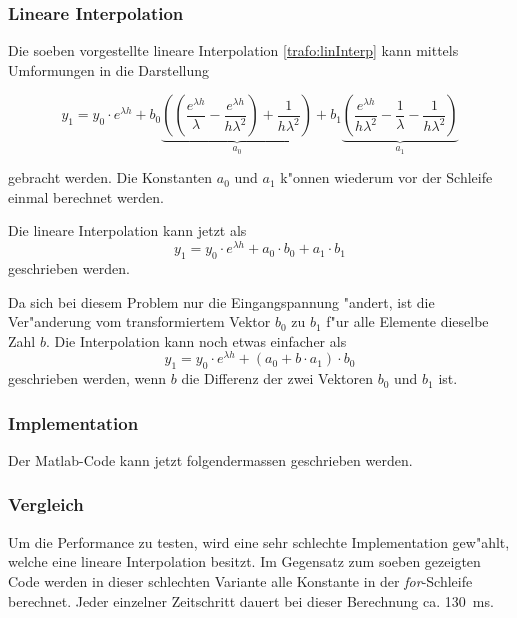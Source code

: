 \begin{refsection}
\subsubsection{Lineare Interpolation}
Die soeben vorgestellte lineare Interpolation \ref{trafo:linInterp} kann mittels Umformungen in die Darstellung 

\begin{equation*}
	y_1 = y_0 \cdot e^{\lambda h} + b_0 \underbrace{\left(\left(\frac{e^{\lambda h}}{\lambda} - \frac{e^{\lambda h}}{h\lambda ^2}\right) + \frac{1}{h \lambda^2}\right)}_{a_0} + b_1 \underbrace{\left(\frac{e^{\lambda h}}{h \lambda^2} - \frac{1}{\lambda} - \frac{1}{h \lambda^2}\right)}_{a_1}
\end{equation*} 

gebracht werden. Die Konstanten $a_0$ und $a_1$ k"onnen wiederum vor der Schleife einmal berechnet werden. 

Die lineare Interpolation kann jetzt als 
\begin{equation*}
	y_1 = y_0 \cdot e^{\lambda h} + a_0 \cdot b_0 + a_1 \cdot b_1
\end{equation*}
geschrieben werden. 

Da sich bei diesem Problem nur die Eingangspannung "andert, ist die Ver"anderung vom transformiertem Vektor $b_0$ zu $b_1$ f"ur alle Elemente dieselbe Zahl $b$. Die Interpolation kann noch etwas einfacher als
\begin{equation*}
	y_1 = y_0 \cdot e^{\lambda h} + (a_0 + b \cdot  a_1) \cdot b_0
\end{equation*}
geschrieben werden, wenn $b$ die Differenz der zwei Vektoren $b_0$ und $b_1$ ist. 

\subsubsection{Implementation}
Der Matlab-Code kann jetzt folgendermassen geschrieben werden.

{\scriptsize }


\subsubsection{Vergleich}

Um die Performance zu testen, wird eine sehr schlechte Implementation gew"ahlt, welche eine lineare Interpolation besitzt. Im Gegensatz zum soeben gezeigten Code werden in dieser schlechten Variante alle Konstante in der \textit{for}-Schleife berechnet. Jeder einzelner Zeitschritt dauert bei dieser Berechnung ca. \SI{130}{\milli\second}. 


\end{refsection}
